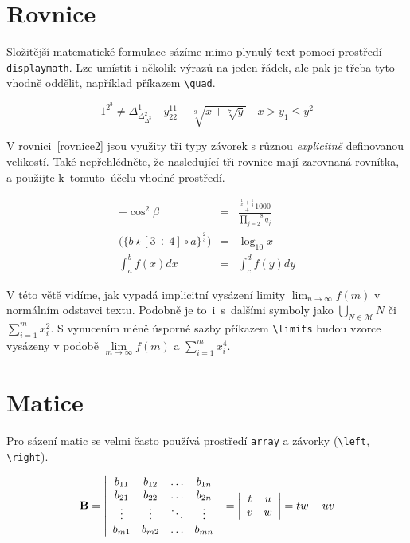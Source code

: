 \documentclass[11pt, a4paper, twocolumn]{article}
\theoremstyle{definition}
\begin{document}
\section{Rovnice}
Složitější matematické formulace sázíme mimo plynulý text pomocí prostředí \texttt{displaymath}. Lze umístit i ně\-ko\-lik výrazů na jeden řádek, ale pak je třeba tyto vhodně oddělit, například příkazem \texttt{\textbackslash quad}.

\begin{displaymath}
    1^{2^3} \neq \Delta^1_{\Delta^2_{\Delta^3}} \quad y^{11}_{22} - \sqrt[9]{x + \sqrt[7]{y}} \quad x > y_1 \leq y^2
\end{displaymath}

\noindent V rovnici~\eqref{rovnice2} jsou využity tři typy závorek s různou \emph{ex\-pli\-cit\-ně} definovanou velikostí. Také nepřehlédněte, že nasledující tři rovnice mají zarovnaná rovnítka, a použijte k~tomuto~účelu vhodné prostředí.


\begin{eqnarray}
    -\cos^2{\beta} & = & \frac{\frac{\frac{1}{x} + \frac{1}{3}} + {1000}}{\overset{8}{\underset{j = 2}{\prod}}q_j} \\
    \label{rovnice2}
    \bigg(\Big\{b \star [3 \div 4] \circ a\Big\}^{\frac{2}{3}}\bigg) & = & \log_{10}x \\
    \label{rovnice3}
    \int^b_a f(x)dx & = & \int^d_c f(y)dy
\end{eqnarray}

\noindent V této větě vidíme, jak vypadá implicitní vysázení limity $\lim_{n \to \infty} f(m)$ v normálním odstavci textu. Podobně je to~i~s~dalšími symboly jako $\bigcup_{N \in \mathcal{M}}N$ či $\sum_{i=1}^m x_i^2$. S vy\-nu\-ce\-ním méně úsporné sazby příkazem \texttt{\textbackslash limits} budou vzorce vysázeny v podobě $\lim\limits_{m \to \infty}f(m)$ a $\sum\limits^m_{i=1}x^4_i$.

\section{Matice}
Pro sázení matic se velmi často používá prostředí \texttt{array} a závorky (\texttt{\textbackslash left}, \texttt{\textbackslash right}).


$$ \text{\textbf{B}} = \left|
\begin{array}{cccc}
b_{11} & b_{12} & \ldots & b_{1n} \\
b_{21} & b_{22} & \ldots & b_{2n} \\
\vdots & \vdots & \ddots & \vdots \\
b_{m1} & b_{m2} & \ldots & b_{mn}
\end{array} \right|
= \left|
\begin{array}{cc}
t & u\\
v & w
\end{array}\right|
= tw - uv$$
\end{document}
